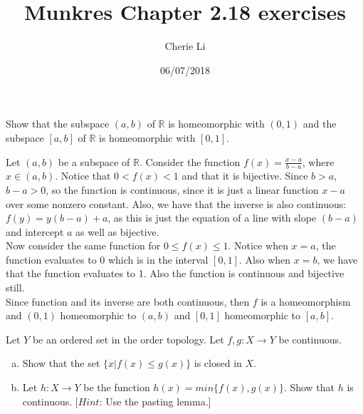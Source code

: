 \documentclass[12pt]{article}
\title{Munkres Chapter 2.18 exercises}
\author{Cherie Li}
\date{06/07/2018}
\newenvironment{problem}[2][Problem]
{
	\begin{trivlist} 
		\item[\hskip \labelsep {\bfseries #1 #2:}]
	}
{
	\end{trivlist}
	}
\newenvironment{solution}[1][Solution]
{
	\begin{trivlist} 
		\item[\hskip \labelsep {\itshape #1:}]
	}
	{
	\end{trivlist}
}
\begin{document}
\maketitle
\newpage
%
%
%
\begin{problem}[Exercise]{2.18.5}
	Show that the subspace $(a, b)$ of $\mathbb{R}$ is homeomorphic with $(0,1)$ and the subspace $[a,b]$ of $\mathbb{R}$ is homeomorphic with $[0,1]$. 
\end{problem}
\begin{solution}
	Let $(a,b)$ be a subspace of $\mathbb{R}$. Consider the function $f(x) = \frac{x-a}{b-a}$, where $x \in (a,b)$. Notice that $0 < f(x) < 1$ and that it is bijective. Since $b > a$, $b-a > 0$, so the function is continuous, since it is just a linear function $x -a$ over some nonzero constant. Also, we have that the inverse is also continuous: $f(y) = y(b-a) + a$, as this is just the equation of a line with slope $(b-a)$ and intercept $a$ as well as bijective. \\
	Now consider the same function for $0 \leq f(x) \leq 1$. Notice when $x = a$, the function evaluates to $0$ which is in the interval $[0, 1]$. Also when $x = b$, we have that the function evaluates to 1. Also the function is continuous and bijective still. \\
	Since function and its inverse are both continuous, then $f$ is a homeomorphism and $(0,1)$ homeomorphic to $(a,b)$ and $[0,1]$ homeomorphic to $[a,b]$. 
\end{solution}
\begin{problem}[Exercise]{2.18.10}
	Let $Y$ be an ordered set in the order topology. Let $f, g: X \rightarrow Y$ be continuous. 
	\begin{enumerate}[(a)]
		\item Show that the set $\lbrace{x | f(x) \leq g(x)\rbrace}$ is closed in $X$. 
		\item Let $h: X \rightarrow Y$ be the function $h(x) = min\lbrace{f(x), g(x)\rbrace}$. Show that $h$ is continuous. [$Hint$: Use the pasting lemma.]
	\end{enumerate}
\end{problem}
\end{document}
